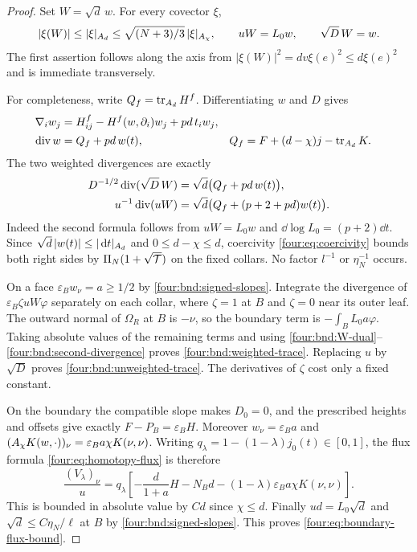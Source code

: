 \begin{proof}
Set $W=\sqrt d\,w$.  For every covector $\xi$,
\begin{equation}\label{four:bnd:W-dual}
 |\xi(W)|\le|\xi|_{A_d}
 \le\sqrt{(N+3)/3}\,|\xi|_{A_\chi},\qquad
 uW=L_0w,\qquad \sqrt D\,W=w.
\end{equation}
The first assertion follows along the axis from
$|\xi(W)|^2=dv\xi(e)^2\le d\xi(e)^2$ and is immediate
transversely.

For completeness, write $Q_f=\operatorname{tr}_{A_d}H^f$.  Differentiating $w$
and $D$ gives
\begin{align*}
 \nabla_iw_j&=H^f_{ij}-H^f(w,\partial_i)w_j+p d\,t_iw_j,\\
 \operatorname{div} w&=Q_f+p d\,w(t),
 &Q_f&=F+(d-\chi)j-\operatorname{tr}_{A_d}K.
\end{align*}
The two weighted divergences are exactly
\begin{align}
 D^{-1/2}\operatorname{div}(\sqrt D\,W)
 &=\sqrt d\bigl(Q_f+p d\,w(t)\bigr),\label{four:bnd:first-divergence}\\
 u^{-1}\operatorname{div}(uW)
 &=\sqrt d\bigl(Q_f+(p+2+p d)w(t)\bigr).
 \label{four:bnd:second-divergence}
\end{align}
Indeed the second formula follows from $uW=L_0w$ and
$\dd\log L_0=(p+2)\dd t$.  Since
$\sqrt d\,|w(t)|\le|\,\mathrm d t|_{A_d}$ and
$0\le d-\chi\le d$, coercivity \eqref{four:eq:coercivity} bounds
both right sides by $\Pi_N(1+\sqrt{\mathcal T})$ on the fixed collars.
No factor $l^{-1}$ or $\eta_N^{-1}$ occurs.

On a face $\varepsilon_Bw_\nu=a\ge1/2$ by
\eqref{four:bnd:signed-slopes}.  Integrate the divergence of
$\varepsilon_B\zeta uW\varphi$ separately on each collar, where
$\zeta=1$ at $B$ and $\zeta=0$ near its outer leaf.  The outward
normal of $\Omega_R$ at $B$ is $-\nu$, so the boundary term is
$-\int_B L_0a\varphi$.  Taking absolute values of the remaining
terms and using \eqref{four:bnd:W-dual}--\eqref{four:bnd:second-divergence}
proves \eqref{four:bnd:weighted-trace}.  Replacing $u$ by $\sqrt D$
proves \eqref{four:bnd:unweighted-trace}.  The derivatives of $\zeta$
cost only a fixed constant.

On the boundary the compatible slope makes $D_0=0$, and the
prescribed heights and offsets give exactly
$F-P_B=\varepsilon_BH$.  Moreover $w_\nu=\varepsilon_Ba$ and
$(A_\chi K(w,\cdot))_\nu=\varepsilon_Ba\chi K(\nu,\nu)$.
Writing $q_\lambda=1-(1-\lambda)j_0(t)\in[0,1]$, the flux
formula \eqref{four:eq:homotopy-flux} is therefore
\[
 \frac{(V_\lambda)_\nu}{u}
 =q_\lambda\left[
 -\frac{d}{1+a}H-N_Bd
 -(1-\lambda)\varepsilon_Ba\chi K(\nu,\nu)\right].
\]
This is bounded in absolute value by $Cd$ since $\chi\le d$.
Finally $ud=L_0\sqrt d$ and
$\sqrt d\le C\eta_N/\ell$ at $B$ by
\eqref{four:bnd:signed-slopes}.  This proves
\eqref{four:eq:boundary-flux-bound}.
\end{proof}

